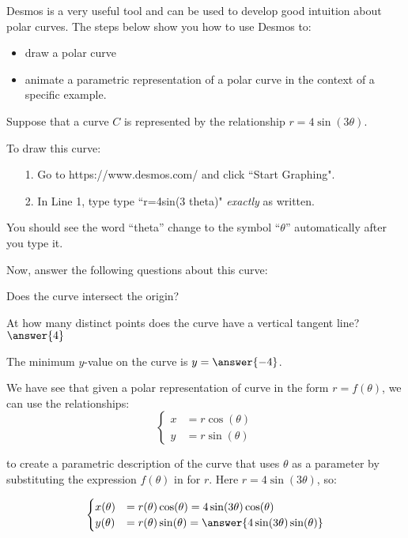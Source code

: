 \documentclass{ximera}
\author{Jim Talamo}
\begin{document}
\begin{exercise}
Desmos is a very useful tool and can be used to develop good intuition about polar curves.  The steps below show you how to use Desmos to:

\begin{itemize}
\item draw a polar curve
\item  animate a parametric representation of a polar curve in the context of a specific example.
\end{itemize}

Suppose that a curve $C$ is represented by the relationship $r=4 \sin(3\theta)$.

To draw this curve:

\begin{itemize}
\item[1.] Go to https://www.desmos.com/ and click ``Start Graphing".
\item[2.] In Line 1, type  type ``r=4sin(3 theta)" \emph{exactly} as written.
\end{itemize}


You should see the word ``theta'' change to the symbol ``$\theta$'' automatically after you type it.

Now, answer the following questions about this curve:

Does the curve intersect the origin?

\begin{multipleChoice}
\end{multipleChoice}


At how many distinct points does the curve have a vertical tangent line?  $\answer{4}$

The minimum $y$-value on the curve is $y=\answer{-4}$.

\begin{exercise}
We have see that given a polar representation of curve in the form $r=f(\theta)$, we can use the relationships:
\[\begin{cases}
x&=r \cos(\theta) \\
y&=r \sin(\theta)
\end{cases}\]

to create a parametric description of the curve that uses $\theta$ as a parameter by substituting the expression $f(\theta)$ in for $r$.  Here $r= 4 \sin(3\theta)$, so:

\[\begin{cases}
x(\theta) &=r(\theta) \cos(\theta) = 4 \sin(3\theta) \cos(\theta) \\
y(\theta) &=r(\theta) \sin(\theta) = \answer{4 \sin(3\theta) \sin(\theta)}
\end{cases}\]


\end{exercise}
\end{exercise}
\end{document}
